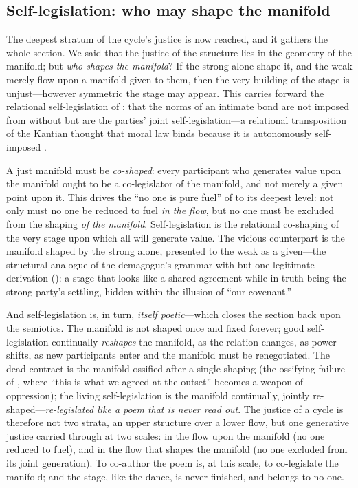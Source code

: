 \subsection{Self-legislation: who may shape the manifold}
\label{p09:sec:self-legislation}

The deepest stratum of the cycle's justice is now reached, and it gathers the whole section. We said that the justice of the structure lies in the geometry of the manifold; but \emph{who shapes the manifold}? If the strong alone shape it, and the weak merely flow upon a manifold given to them, then the very building of the stage is unjust---however symmetric the stage may appear. This carries forward the relational self-legislation of : that the norms of an intimate bond are not imposed from without but are the parties' joint self-legislation---a relational transposition of the Kantian thought that moral law binds because it is autonomously self-imposed \parencite{kant1998}.

\begin{claim}
A just manifold must be \emph{co-shaped}: every participant who generates value upon the manifold ought to be a co-legislator of the manifold, and not merely a given point upon it. This drives the ``no one is pure fuel'' of  to its deepest level: not only must no one be reduced to fuel \emph{in the flow}, but no one must be excluded from the shaping \emph{of the manifold}. Self-legislation is the relational co-shaping of the very stage upon which all will generate value. The vicious counterpart is the manifold shaped by the strong alone, presented to the weak as a given---the structural analogue of the demagogue's grammar with but one legitimate derivation (): a stage that looks like a shared agreement while in truth being the strong party's settling, hidden within the illusion of ``our covenant.''
\end{claim}

And self-legislation is, in turn, \emph{itself poetic}---which closes the section back upon the semiotics. The manifold is not shaped once and fixed forever; good self-legislation continually \emph{reshapes} the manifold, as the relation changes, as power shifts, as new participants enter and the manifold must be renegotiated. The dead contract is the manifold ossified after a single shaping (the ossifying failure of , where ``this is what we agreed at the outset'' becomes a weapon of oppression); the living self-legislation is the manifold continually, jointly re-shaped---\emph{re-legislated like a poem that is never read out}.  The justice of a cycle is therefore not two strata, an upper structure over a lower flow, but one generative justice carried through at two scales: in the flow upon the manifold (no one reduced to fuel), and in the flow that shapes the manifold (no one excluded from its joint generation). To co-author the poem is, at this scale, to co-legislate the manifold; and the stage, like the dance, is never finished, and belongs to no one.
